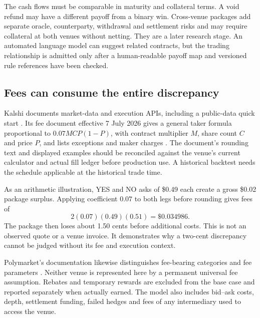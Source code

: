 \documentclass[11pt]{article}
\theoremstyle{remark}\newtheorem{example}{Example}
\begin{document}
The cash flows must be comparable in maturity and collateral terms. A void
refund may have a different payoff from a binary win. Cross-venue packages
add separate oracle, counterparty, withdrawal and settlement risks and may
require collateral at both venues without netting. They are a later research
stage. An automated language model can suggest related contracts, but the
trading relationship is admitted only after a human-readable payoff map and
versioned rule references have been checked.

\subsection{Fees can consume the entire discrepancy}
Kalshi documents market-data and execution APIs, including a public-data
quick start \citep{kalshiapi,kalshidata}. Its fee document effective
7 July 2026 gives a general taker formula proportional to
$0.07MCP(1-P)$, with contract multiplier $M$, share count $C$ and price $P$,
and lists exceptions and maker charges \citep{kalshifees}. The document's
rounding text and displayed examples should be reconciled against the venue's
current calculator and actual fill ledger before production use. A historical
backtest needs the schedule applicable at the historical trade time.

As an arithmetic illustration, YES and NO asks of \$0.49 each create a gross
\$0.02 package surplus. Applying coefficient $0.07$ to both legs before
rounding gives fees of
\begin{equation}
 2(0.07)(0.49)(0.51)=\$0.034986.
\end{equation}
The package then loses about 1.50 cents before additional costs. This is not an
observed quote or a venue invoice. It demonstrates why a two-cent discrepancy
cannot be judged without its fee and execution context.

Polymarket's documentation likewise distinguishes fee-bearing categories and
fee parameters \citep{polymarketfees}. Neither venue is represented here by a
permanent universal fee assumption. Rebates and temporary rewards are excluded
from the base case and reported separately when actually earned. The model
also includes bid--ask costs, depth, settlement funding, failed hedges and
fees of any intermediary used to access the venue.
\end{document}
